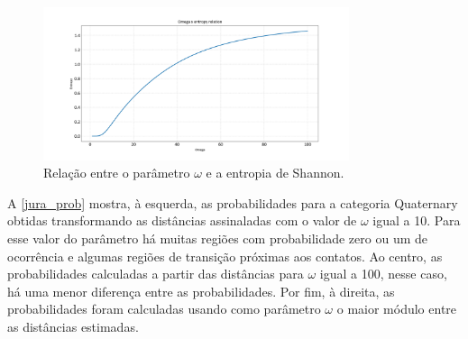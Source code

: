 \begin{figure}[H]
\caption{\label{omega_ent} Relação entre o parâmetro $\omega$ e a entropia de Shannon.}
	\centering
		\includegraphics[width=0.8\textwidth]{capitulo_2/imagens/omega_entropy.png}
\end{figure}

A \autoref{jura_prob} mostra, à esquerda, as probabilidades para a categoria Quaternary obtidas transformando as distâncias assinaladas com o valor de $\omega$ igual a 10. Para esse valor do parâmetro há muitas regiões com probabilidade zero ou um de ocorrência e algumas regiões de transição próximas aos contatos. Ao centro, as probabilidades calculadas a partir das distâncias para $\omega$ igual a 100, nesse caso, há uma menor diferença entre as probabilidades. Por fim, à direita, as probabilidades foram calculadas usando como parâmetro $\omega$ o maior módulo entre as distâncias estimadas.

